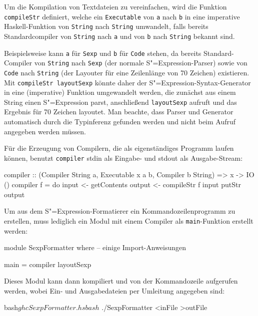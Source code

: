 \documentclass[12pt, a4paper, bibgerm]{scrbook}
\newenvironment{DIFnomarkup}{}{}
\newcommand\icode[1]{\lstinline?#1?}
\newcommand{\sexp}{S"=Expression}
\begin{document}
Um die Kompilation von Textdateien zu vereinfachen, wird die Funktion
\icode{compileStr} definiert, welche ein \icode{Executable} von
\icode{a} nach \icode{b} in eine imperative Haskell-Funktion von
\icode{String} nach \icode{String} umwandelt, falls bereits
Standardcompiler von \icode{String} nach \icode{a} und von \icode{b}
nach \icode{String} bekannt sind.   
\begin{DIFnomarkup}\end{DIFnomarkup} %
Beispielsweise kann \icode{a} für \icode{Sexp} und \icode{b} für
\icode{Code} stehen, da bereits Standard-Compiler von \icode{String}
nach \icode{Sexp} (der normale \sexp{}-Parser) sowie von \icode{Code}
nach \icode{String} (der Layouter für eine Zeilenlänge von 70 Zeichen)
existieren. Mit \icode{compileStr layoutSexp} könnte daher der
\sexp{}-Syntax-Generator in eine (imperative) Funktion umgewandelt
werden, die zunächst aus einem String einen \sexp{} parst, anschließend
\icode{layoutSexp} aufruft und das Ergebnis für 70 Zeichen layoutet. Man
beachte, dass Parser und Generator automatisch durch die Typinferenz
gefunden werden und nicht beim Aufruf angegeben werden müssen.

Für die Erzeugung von Compilern, die als eigenständiges Programm laufen
können, benutzt \icode{compiler} stdin als Eingabe- und stdout als
Ausgabe-Stream:
\begin{DIFnomarkup}\begin{code}
compiler :: (Compiler String a, Executable x a b, Compiler b String) => 
            x -> IO ()
compiler f = do
  input <- getContents
  output <- compileStr f input
  putStr output  
\end{code}\end{DIFnomarkup}
Um aus dem \sexp{}-Formatierer ein Kommandozeilenprogramm
zu erstellen, muss lediglich ein Modul mit einem Compiler als
\icode{main}-Funktion erstellt werden:
\begin{DIFnomarkup}\begin{code}
module SexpFormatter where
-- einige Import-Anweisungen

main = compiler layoutSexp
\end{code}\end{DIFnomarkup}
Dieses Modul kann dann kompiliert und von der Kommandozeile
aufgerufen werden, wobei Ein- und Ausgabedateien per Umleitung angegeben
sind:
\begin{DIFnomarkup}\begin{code}
bash$ ghc SexpFormatter.hs
bash$ ./SexpFormatter <inFile >outFile
\end{code}\end{DIFnomarkup}
\end{document}
